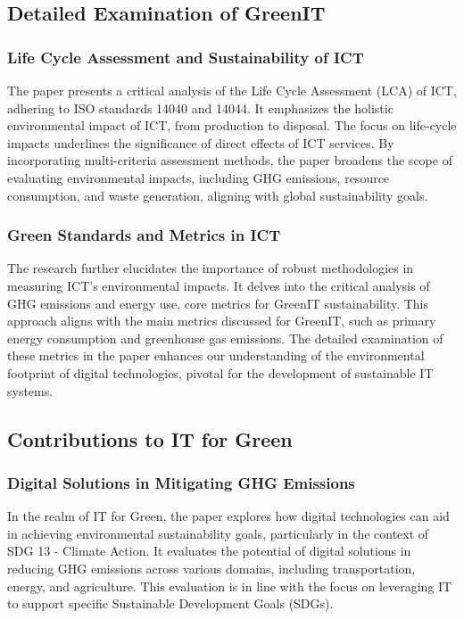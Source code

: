 \documentclass[conference,compsoc]{IEEEtran}
\begin{document}
\subsection{Detailed Examination of GreenIT}

\subsubsection{Life Cycle Assessment and Sustainability of ICT}

The paper presents a critical analysis of the Life Cycle Assessment (LCA) of ICT, adhering to ISO standards 14040 and 14044. It emphasizes the holistic environmental impact of ICT, from production to disposal. The focus on life-cycle impacts underlines the significance of direct effects of ICT services. By incorporating multi-criteria assessment methods, the paper broadens the scope of evaluating environmental impacts, including GHG emissions, resource consumption, and waste generation, aligning with global sustainability goals.

\subsubsection{Green Standards and Metrics in ICT}

The research further elucidates the importance of robust methodologies in measuring ICT's environmental impacts. It delves into the critical analysis of GHG emissions and energy use, core metrics for GreenIT sustainability. This approach aligns with the main metrics discussed for GreenIT, such as primary energy consumption and greenhouse gas emissions. The detailed examination of these metrics in the paper enhances our understanding of the environmental footprint of digital technologies, pivotal for the development of sustainable IT systems.

\subsection{Contributions to IT for Green}

\subsubsection{Digital Solutions in Mitigating GHG Emissions}

In the realm of IT for Green, the paper explores how digital technologies can aid in achieving environmental sustainability goals, particularly in the context of SDG 13 - Climate Action. It evaluates the potential of digital solutions in reducing GHG emissions across various domains, including transportation, energy, and agriculture. This evaluation is in line with the  focus on leveraging IT to support specific Sustainable Development Goals (SDGs).
\end{document}
